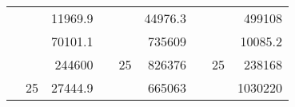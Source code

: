 \begin{table}[H]
\begin{tabular}{|ccrccrccc}
\rowcolor[HTML]{DAE8FC} 
\multicolumn{1}{|c|}{\cellcolor[HTML]{FFFFC7}}                                & \multicolumn{1}{c|}{\cellcolor[HTML]{DAE8FC}}                      & \multicolumn{1}{r|}{\cellcolor[HTML]{DAE8FC}11969.9}   & \multicolumn{1}{c|}{\cellcolor[HTML]{FFFFC7}}                                & \multicolumn{1}{c|}{\cellcolor[HTML]{DAE8FC}}                       & \multicolumn{1}{r|}{\cellcolor[HTML]{DAE8FC}44976.3}   & \multicolumn{1}{c|}{\cellcolor[HTML]{FFFFC7}}                                & \multicolumn{1}{c|}{\cellcolor[HTML]{DAE8FC}}                      & \multicolumn{1}{r|}{\cellcolor[HTML]{DAE8FC}499108}    \\ \cline{3-3} \cline{6-6} \cline{9-9} 
\multicolumn{1}{|c|}{\cellcolor[HTML]{FFFFC7}}                                & \multicolumn{1}{c|}{\cellcolor[HTML]{DAE8FC}}                      & \multicolumn{1}{r|}{\cellcolor[HTML]{DDFDFF}70101.1}   & \multicolumn{1}{c|}{\cellcolor[HTML]{FFFFC7}}                                & \multicolumn{1}{c|}{\cellcolor[HTML]{DAE8FC}}                       & \multicolumn{1}{r|}{\cellcolor[HTML]{DDFDFF}735609}    & \multicolumn{1}{c|}{\cellcolor[HTML]{FFFFC7}}                                & \multicolumn{1}{c|}{\cellcolor[HTML]{DAE8FC}}                      & \multicolumn{1}{r|}{\cellcolor[HTML]{DDFDFF}10085.2}   \\ \cline{3-3} \cline{6-6} \cline{9-9} 
\rowcolor[HTML]{DAE8FC} 
\multicolumn{1}{|c|}{\cellcolor[HTML]{FFFFC7}}                                & \multicolumn{1}{c|}{\cellcolor[HTML]{DAE8FC}}                      & \multicolumn{1}{r|}{\cellcolor[HTML]{DAE8FC}244600}    & \multicolumn{1}{c|}{\cellcolor[HTML]{FFFFC7}}                                & \multicolumn{1}{c|}{\multirow{-9}{*}{\cellcolor[HTML]{DAE8FC}25}}   & \multicolumn{1}{r|}{\cellcolor[HTML]{DAE8FC}826376}    & \multicolumn{1}{c|}{\cellcolor[HTML]{FFFFC7}}                                & \multicolumn{1}{c|}{\multirow{-9}{*}{\cellcolor[HTML]{DAE8FC}25}}  & \multicolumn{1}{r|}{\cellcolor[HTML]{DAE8FC}238168}    \\ \cline{3-3} \cline{5-6} \cline{8-9} 
\multicolumn{1}{|c|}{\cellcolor[HTML]{FFFFC7}}                                & \multicolumn{1}{c|}{\multirow{-10}{*}{\cellcolor[HTML]{DAE8FC}25}} & \multicolumn{1}{r|}{\cellcolor[HTML]{DDFDFF}27444.9}   & \multicolumn{1}{c|}{\cellcolor[HTML]{FFFFC7}}                                & \multicolumn{1}{c|}{\cellcolor[HTML]{DDFDFF}}                       & \multicolumn{1}{r|}{\cellcolor[HTML]{DAE8FC}665063}    & \multicolumn{1}{c|}{\cellcolor[HTML]{FFFFC7}}                                & \multicolumn{1}{c|}{\cellcolor[HTML]{DDFDFF}}                      & \multicolumn{1}{r|}{\cellcolor[HTML]{DAE8FC}1030220}   \\ \cline{2-3} \cline{6-6} \cline{9-9} 

\end{tabular}
\end{table}
